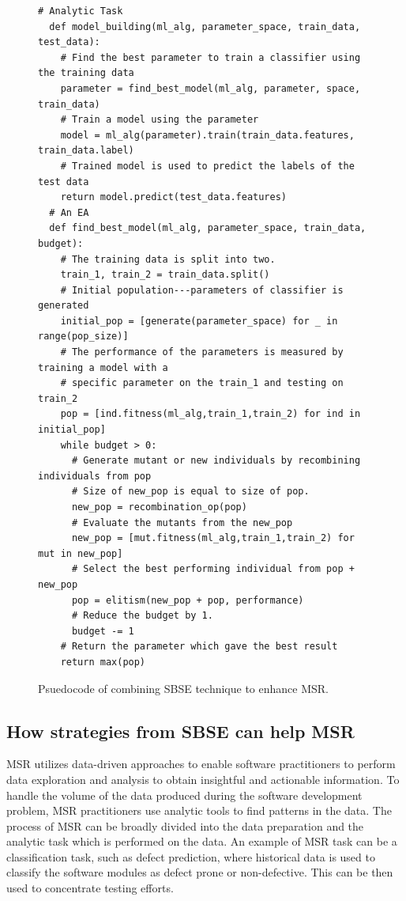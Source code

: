 \documentclass[table, xcdraw, sigconf,review, anonymous]{acmart}
\begin{document}
\begin{figure}[t]
\small
\hspace{0.4cm}
\begin{lstlisting}[xrightmargin=5.0ex,mathescape,frame=none,numbers=right,linebackgroundcolor={%
        \ifnum\value{lstnumber}>9
            \ifnum\value{lstnumber}<30
                \color{gray!25}
            \fi
        \fi},autogobble=true,]
  # Analytic Task
  def model_building(ml_alg, parameter_space, train_data, test_data):
    # Find the best parameter to train a classifier using the training data
    parameter = find_best_model(ml_alg, parameter, space, train_data)
    # Train a model using the parameter 
    model = ml_alg(parameter).train(train_data.features, train_data.label)
    # Trained model is used to predict the labels of the test data
    return model.predict(test_data.features)
  # An EA
  def find_best_model(ml_alg, parameter_space, train_data, budget):
    # The training data is split into two. 
    train_1, train_2 = train_data.split()
    # Initial population---parameters of classifier is generated
    initial_pop = [generate(parameter_space) for _ in range(pop_size)]
    # The performance of the parameters is measured by training a model with a 
    # specific parameter on the train_1 and testing on train_2
    pop = [ind.fitness(ml_alg,train_1,train_2) for ind in initial_pop]
    while budget > 0:
      # Generate mutant or new individuals by recombining individuals from pop
      # Size of new_pop is equal to size of pop.
      new_pop = recombination_op(pop)
      # Evaluate the mutants from the new_pop
      new_pop = [mut.fitness(ml_alg,train_1,train_2) for mut in new_pop]
      # Select the best performing individual from pop + new_pop
      pop = elitism(new_pop + pop, performance)
      # Reduce the budget by 1. 
      budget -= 1
    # Return the parameter which gave the best result
    return max(pop)

\end{lstlisting}
\caption{\small{Psuedocode of combining SBSE technique to enhance MSR.}
}
\label{fig:EAMSR}  
\end{figure}


\subsection{How strategies from SBSE can help MSR}

MSR utilizes data-driven approaches to enable software practitioners to perform data exploration and analysis to obtain insightful and actionable information. To handle the volume of the data produced during the software development problem, MSR practitioners use analytic tools to find patterns in the data. The process of MSR can be broadly divided into the data preparation and the analytic task which is performed on the data. An example of MSR task can be a classification task, such as defect prediction, where historical data is used to classify the software modules as defect prone or non-defective. This can be then used to concentrate testing efforts. 
\end{document}
